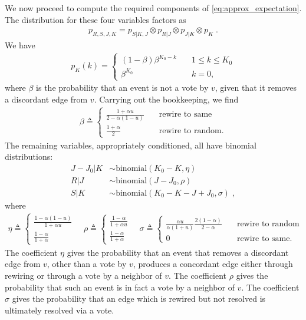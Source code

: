 \documentclass[english]{scrartcl}
\begin{document}
	We now proceed to compute the required components of \eqref{eq:approx_expectation}. The distribution for these four variables factors as 
	\begin{align*}
		p_{R, S, J, K} = p_{S|K,J} \otimes p_{R|J} \otimes  p_{J|K}\otimes p_K\;.
	\end{align*}
	We have 
	\begin{align*}
		p_{K}(k) = 
		\begin{cases}
			(1-\beta)\beta^{K_0 - k} &\quad 1\leq k \leq K_0\\ 
			\beta^{K_0} &\quad k = 0,
 		\end{cases}
	\end{align*}
	where $\beta$ is the probability that an event is not a vote by $v$, given that it removes a discordant edge from $v$. Carrying out the bookkeeping, we find 
	\begin{align*}
		\beta \triangleq 
		\begin{cases}
			\frac{1+\alpha u}{2-\alpha(1-u)} &\quad \text{rewire to same}\\ 
			\frac{1+\alpha}{2} &\quad \text{rewire to random.}
		\end{cases}
	\end{align*}
	The remaining variables, appropriately conditioned, all have binomial distributions: 
	\begin{align*}
		J-J_0|K &\sim \text{binomial}(K_0 - K, \eta) \\ 
		R|J &\sim \text{binomial}(J - J_0, \rho) \\ 
		S|K &\sim \text{binomial}(K_0 - K - J + J_0, \sigma)\;,
	\end{align*}
	where 
	\begin{align*}
			\eta \triangleq 
			\begin{cases}
				\frac{1-\alpha(1-u)}{1+\alpha u}  \\ 
				\frac{1-\alpha}{1+\alpha} 
			\end{cases} \quad 
			\rho \triangleq 
			\begin{cases}
				\frac{1-\alpha}{1+\alpha u}  \\ 
				\frac{1-\alpha}{1+\alpha}   
			\end{cases} \quad 
			\sigma \triangleq 
			\begin{cases}
				\frac{\alpha u}{\alpha(1+u)}\frac{2(1-\alpha)}{2-\alpha} &\quad \text{rewire to random} \\ 
				0   &\quad \text{rewire to same.}
			\end{cases}
		\end{align*}
	The coefficient $\eta$ gives the probability that an event that removes a discordant edge from $v$, other than a vote by $v$, produces a concordant edge either through rewiring or through a vote by a neighbor of $v$. The coefficient $\rho$ gives the probability that such an event is in fact a vote by a neighbor of $v$. The coefficient $\sigma$ gives the probability that an edge which is rewired but not resolved is ultimately resolved via a vote. 
\end{document}
